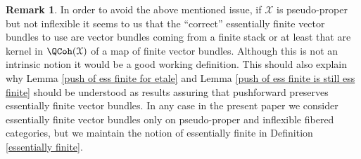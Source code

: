 \documentclass[12pt,reqno]{amsart}
\theoremstyle{plain}
\theoremstyle{definition}
\newtheorem{rmk}[thm]{Remark}
\numberwithin{thm}{section}
\newcounter{x}\setcounter{x}{1}
\theoremstyle{plain}
\begin{document}
\begin{rmk}
In order to avoid the above mentioned issue, if ${\mathcal{X}}$ is pseudo-proper but not inflexible it seems to us that the 
``correct'' essentially finite vector bundles to use are vector bundles coming from a finite 
stack or at least that are kernel in $\QCoh({\mathcal{X}})$ of a map of finite vector bundles. 
Although this is not an intrinsic notion it would be a good working definition. This should 
also explain why Lemma \ref{push of ess finite for etale} and Lemma \ref{push of ess finite is still ess 
finite} should be understood as results assuring that pushforward preserves essentially 
finite vector bundles. In any case in the present paper we consider essentially 
finite vector bundles only on pseudo-proper and inflexible fibered categories, but we 
maintain the notion of essentially finite in Definition \ref{essentially finite}.
 

\end{rmk}
\end{document}
